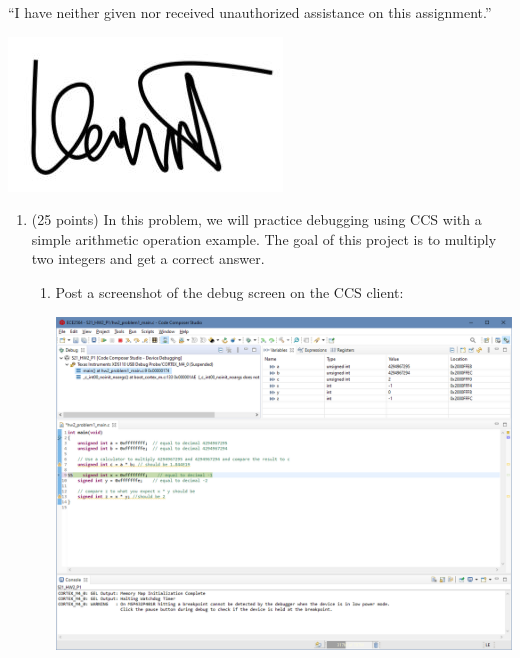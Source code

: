 \documentclass{article}
\begin{document}
\begin{center}
    “I have neither given nor received unauthorized assistance on this assignment.”
    
    \includegraphics[width = .1\textwidth]{Signature.jpg}
\end{center}
\begin{enumerate}
    \item (25  points)  In  this  problem,  we  will  practice  debugging  using  CCS  with  a simple arithmetic operation example. The goal of this project is to multiply two integers and get a correct answer.  
    \begin{enumerate}
        \addtocounter{enumii}{4}
        \item Post a screenshot of the debug screen on the CCS client:
        \begin{center}
            \includegraphics[width = .9\textwidth]{1e.png}
            

\end{center}
\end{enumerate}
\end{enumerate}
\end{document}
